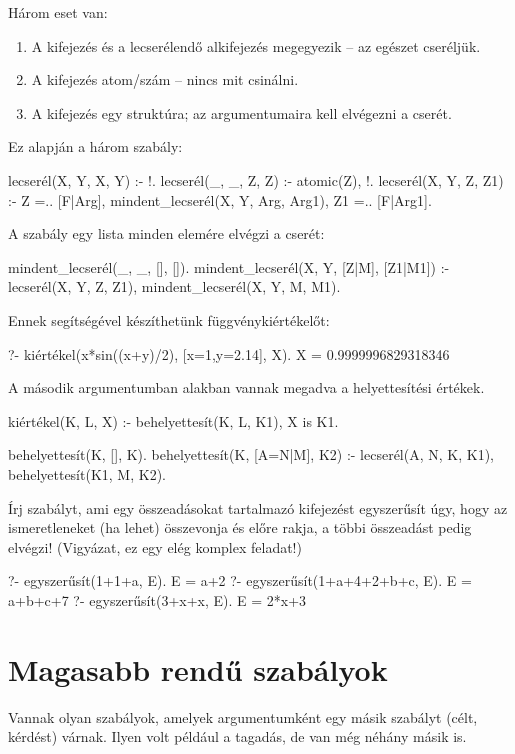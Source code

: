 Három eset van:
\begin{enumerate}
\item A kifejezés és a lecserélendő alkifejezés
  megegyezik -- az egészet cseréljük.
\item A kifejezés atom/szám -- nincs mit csinálni.
\item A kifejezés egy struktúra; az argumentumaira
  kell elvégezni a cserét.
\end{enumerate}
Ez alapján a három szabály:
\begin{program}
lecserél(X, Y, X, Y) :- !.
lecserél(_, _, Z, Z) :- atomic(Z), !.
lecserél(X, Y, Z, Z1) :-
    Z =.. [F|Arg],
    mindent_lecserél(X, Y, Arg, Arg1),
    Z1 =.. [F|Arg1].
\end{program}
A  szabály egy lista minden
elemére elvégzi a cserét:
\begin{program}
mindent_lecserél(_, _, [], []).
mindent_lecserél(X, Y, [Z|M], [Z1|M1]) :-
    lecserél(X, Y, Z, Z1),
    mindent_lecserél(X, Y, M, M1).
\end{program}
Ennek segítségével készíthetünk függvénykiértékelőt:
\begin{query}
?- kiértékel(x*sin((x+y)/2), [x=1,y=2.14], X).
X = 0.9999996829318346
\end{query}
A második argumentumban 
alakban vannak megadva a helyettesítési értékek.
\begin{program}
kiértékel(K, L, X) :-
    behelyettesít(K, L, K1), X is K1.

behelyettesít(K, [], K).
behelyettesít(K, [A=N|M], K2) :-
    lecserél(A, N, K, K1),
    behelyettesít(K1, M, K2).
\end{program}

\begin{problem}
Írj szabályt, ami egy összeadásokat
tartalmazó kifejezést egyszerűsít úgy, hogy az
ismeretleneket (ha lehet) összevonja és előre
rakja, a többi összeadást pedig elvégzi!
(Vigyázat, ez egy elég komplex feladat!)
\begin{query}
?- egyszerűsít(1+1+a, E).
E = a+2
?- egyszerűsít(1+a+4+2+b+c, E).
E = a+b+c+7
?- egyszerűsít(3+x+x, E).
E = 2*x+3
\end{query}
\end{problem}

\section{Magasabb rendű szabályok}
Vannak olyan szabályok, amelyek argumentumként egy
másik szabályt (célt, kérdést) várnak. Ilyen volt
például a tagadás, de van még néhány másik is.

